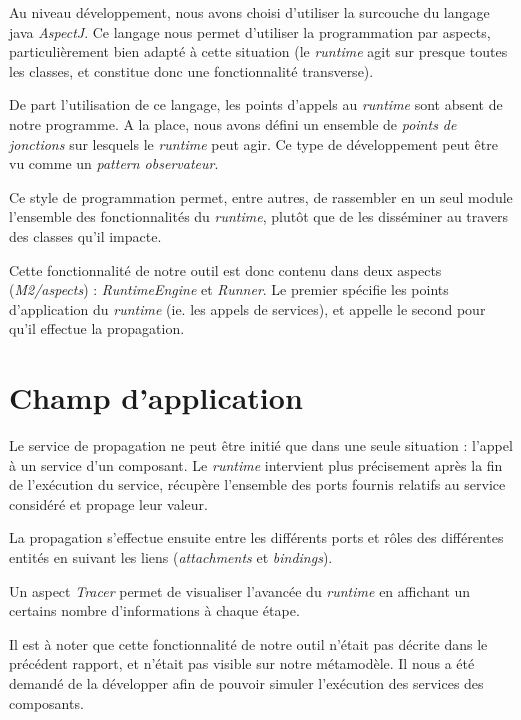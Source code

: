         Au niveau développement, nous avons choisi d'utiliser la surcouche du langage java \emph{AspectJ}. Ce langage nous permet d'utiliser la programmation par aspects, particulièrement bien adapté à cette situation (le \emph{runtime} agit sur presque toutes les classes, et constitue donc une fonctionnalité transverse).
        \newline
        
        De part l'utilisation de ce langage, les points d'appels au \emph{runtime} sont absent de notre programme. A la place, nous avons défini un ensemble de \emph{points de jonctions} sur lesquels le \emph{runtime} peut agir. Ce type de développement peut être vu comme un \emph{pattern  observateur}.
        
        Ce style de programmation permet, entre autres, de rassembler en un seul module l'ensemble des fonctionnalités du \emph{runtime}, plutôt que de les disséminer au travers des classes qu'il impacte.
        \newline
        
        Cette fonctionnalité de notre outil est donc contenu dans deux aspects (\emph{M2/aspects}) : \emph{RuntimeEngine} et \emph{Runner}. Le premier spécifie les points d'application du \emph{runtime} (ie. les appels de services), et appelle le second pour qu'il effectue la propagation.
        
	\section{Champ d'application}
    	Le service de propagation ne peut être initié que dans une seule situation : l'appel à un service d'un composant. Le \emph{runtime} intervient plus précisement après la fin de l'exécution du service, récupère l'ensemble des ports fournis relatifs au service considéré et propage leur valeur.
        \newline
        
        La propagation s'effectue ensuite entre les différents ports et rôles des différentes entités en suivant les liens (\emph{attachments} et \emph{bindings}).
        \newline
        
        Un aspect \emph{Tracer} permet de visualiser l'avancée du \emph{runtime} en affichant un certains nombre d'informations à chaque étape.
        \newline
        
        Il est à noter que cette fonctionnalité de notre outil n'était pas décrite dans le précédent rapport, et n'était pas visible sur notre métamodèle. Il nous a été demandé de la développer afin de pouvoir simuler l'exécution des services des composants.
        
